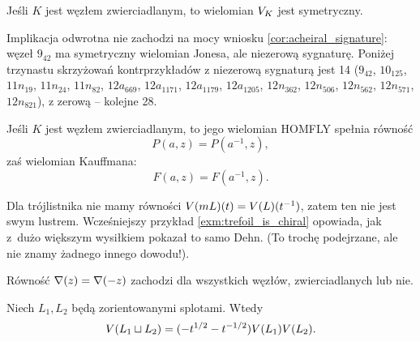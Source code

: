 \begin{corollary}
%
\label{cor:jones_of_amphicheiral}%
    Jeśli $K$ jest węzłem zwierciadlanym, to wielomian $V_K$ jest symetryczny.
\end{corollary}

Implikacja odwrotna nie zachodzi na mocy wniosku \ref{cor:acheiral_signature}: węzeł $9_{42}$ ma symetryczny wielomian Jonesa, ale niezerową sygnaturę.
%
Poniżej trzynastu skrzyżowań kontrprzykładów z niezerową sygnaturą jest 14 ($9_{42}$, $10_{125}$, $11n_{19}$, $11n_{24}$, $11n_{82}$, $12a_{669}$, $12a_{1171}$, $12a_{1179}$, $12a_{1205}$, $12n_{362}$, $12n_{506}$, $12n_{562}$, $12n_{571}$, $12n_{821}$), z zerową -- kolejne 28.

\begin{corollary}
%
    Jeśli $K$ jest węzłem zwierciadlanym, to jego wielomian HOMFLY spełnia równość
    \begin{equation}
        P(a, z) = P(a^{-1}, z),
    \end{equation}
    zaś wielomian Kauffmana:
    \begin{equation}
        F(a, z) = F(a^{-1}, z).
    \end{equation}
\end{corollary}

Dla trójlistnika nie mamy równości $V(mL)(t) = V(L)(t^{-1})$, zatem ten nie jest swym lustrem.
Wcześniejszy przykład \ref{exm:trefoil_is_chiral} opowiada, jak z~dużo większym wysiłkiem pokazał to samo Dehn.
%
(To trochę podejrzane, ale nie znamy żadnego innego dowodu!).

Równość $\nabla(z) = \nabla(-z)$ zachodzi dla wszystkich węzłów, zwierciadlanych lub nie.

\begin{proposition}
%
\label{prp:jones_multiplicative_1}%
    Niech $L_1, L_2$ będą zorientowanymi splotami.
    Wtedy
    \begin{equation}
        V(L_1 \sqcup L_2) = (-t^{1/2} - t^{-1/2}) V(L_1) V(L_2).
    \end{equation}
\end{proposition}

